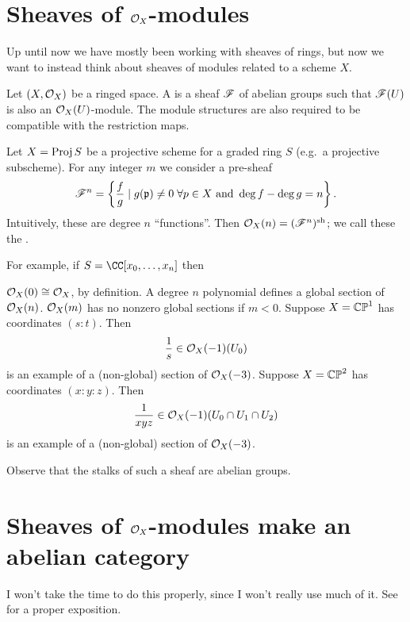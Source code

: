 \documentclass[11pt]{scrreprt}
\begin{document}
\section{Sheaves of $\mathcal O_X$-modules}
Up until now we have mostly been working with sheaves of rings,
but now we want to instead think about sheaves of modules related
to a scheme $X$. 
\begin{definition}
	Let $(X, \mathcal O_X)$ be a ringed space.
	A  is a sheaf $\mathscr F$
	of abelian groups such that $\mathscr F(U)$ is also an $\mathcal O_X(U)$-module.
	The module structures are also required to be compatible
	with the restriction maps.
\end{definition}
\begin{example}
	Let $X = \operatorname{Proj} S$ be a projective scheme for a graded ring $S$
	(e.g.\ a projective subscheme).
	For any integer $m$ we consider a pre-sheaf
	\[ \mathscr F^n = \left\{ \frac fg \mid g(\mathfrak p)\neq 0 \;\forall p \in X 
		\text{ and } \deg f - \deg g = n \right\}.
	\]
	Intuitively, these are degree $n$ ``functions''.
	Then $\mathcal O_X(n) = (\mathscr F^n)^\mathrm{sh}$;
	we call these the .

	For example, if $S = \CC[x_0, \dots, x_n]$ then
	\begin{enumerate}[(a)]
		\ii $\mathcal O_X(0) \cong \mathcal O_X$, by definition.
		\ii A degree $n$ polynomial defines a global section of $\mathcal O_X(n)$.
		\ii $\mathcal O_X(m)$ has no nonzero global sections if $m < 0$.
		\ii Suppose $X = \mathbb{CP}^1$ has coordinates $(s:t)$. Then
		\[ \frac 1s \in \mathcal O_X(-1)(U_0) \]
		is an example of a (non-global) section of $\mathcal O_X(-3)$.
		\ii Suppose $X = \mathbb{CP}^2$ has coordinates $(x:y:z)$. Then
		\[ \frac{1}{xyz} \in \mathcal O_X(-1)(U_0 \cap U_1 \cap U_2) \]
		is an example of a (non-global) section of $\mathcal O_X(-3)$.
	\end{enumerate}
\end{example}

Observe that the stalks of such a sheaf are abelian groups.

\section{Sheaves of $\mathcal O_X$-modules make an abelian category}
I won't take the time to do this properly,
since I won't really use much of it.
See \cite{ref:vakil} for a proper exposition.
\end{document}
